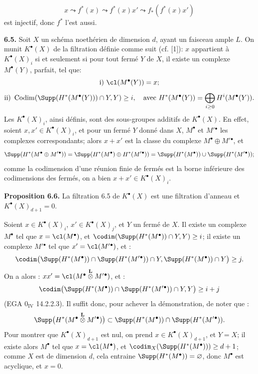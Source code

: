 \[
  x\leadsto f^*(x)\leadsto f^*(x)x'\leadsto f_*(f^*(x)x')
\]
est
injectif, donc $f^*$ l'est aussi.

\textbf{6.5.} Soit $X$ un schéma noethérien de dimension $d$, ayant un faisceau ample $L$. On munit $K^{\bullet}(X)$ de la filtration définie comme suit (cf. [1]): $x$ appartient à $K^{\bullet}(X)_i$ si et seulement si pour tout fermé $Y$ de $X$, il existe un complexe $M^\bullet(Y)$, parfait, tel que:
\[
  \text{i) } \cl(M^\bullet(Y))=x;
\]
\[
  \text{ii) } \operatorname{Codim}(\Supp(H^*(M^\bullet(Y)))\cap Y,Y)\ge i,
  \quad\text{avec } H^*(M^\bullet(Y))=\bigoplus_{i\ge0}H^i(M^\bullet(Y)).
\]
Les $K^{\bullet}(X)_i$, ainsi définis, sont des sous-groupes additifs de $K^{\bullet}(X)$. En effet, soient $x,x'\in K^{\bullet}(X)_i$, et pour un fermé $Y$ donné dans $X$, $M^\bullet$ et $M'{}^\bullet$ les complexes correspondants; alors $x+x'$ est la classe du complexe $M^\bullet\oplus M'{}^\bullet$, et
\[
\Supp(H^*(M^\bullet\oplus M'{}^\bullet))
 =\Supp(H^*(M^\bullet)\oplus H^*(M'{}^\bullet))
 =\Supp(H^*(M^\bullet))\cup\Supp(H^*(M'{}^\bullet));
\]
comme la codimension d'une réunion finie de fermés est la borne inférieure des codimensions des fermés, on a bien $x+x'\in K^{\bullet}(X)_i$.

\textbf{Proposition 6.6.} La filtration 6.5 de $K^{\bullet}(X)$ est une filtration d'anneau et $K^{\bullet}(X)_{d+1}=0$.

Soient $x\in K^{\bullet}(X)_i$, $x'\in K^{\bullet}(X)_j$, et $Y$ un fermé de $X$. Il existe un complexe $M^\bullet$ tel que $x=\cl(M^\bullet)$, et $\codim(\Supp(H^*(M^\bullet))\cap Y,Y)\ge i$; il existe un complexe $M'{}^\bullet$ tel que $x'=\cl(M'{}^\bullet)$, et :
\[
\codim\bigl(\Supp(H^*(M^\bullet))\cap\Supp(H^*(M'{}^\bullet))\cap Y,
            \Supp(H^*(M^\bullet))\cap Y\bigr)\ge j.
\]
On a alors : $xx'=\cl(M^\bullet\overset{\mathbf L}{\otimes}M'{}^\bullet)$, et :
\[
\codim\bigl(\Supp(H^*(M^\bullet))\cap\Supp(H^*(M'{}^\bullet))\cap Y,Y\bigr)\ge i+j
\]
(EGA $0_{\mathrm{IV}}$ 14.2.2.3). Il
suffit donc, pour achever la démonstration, de noter que :
\[
\Supp\bigl(H^*(M^\bullet\overset{\mathbf L}{\otimes}M'{}^\bullet)\bigr)
 \subset \Supp(H^*(M^\bullet))\cap\Supp(H^*(M'{}^\bullet)).
\]
Pour montrer que $K^{\bullet}(X)_{d+1}$ est nul, on prend $x\in K^{\bullet}(X)_{d+1}$, et $Y=X$; il existe alors $M^\bullet$ tel que $x=\cl(M^\bullet)$, et $\codim_X(\Supp(H^*(M^\bullet)))\ge d+1$; comme $X$ est de dimension $d$, cela entraine $\Supp(H^*(M^\bullet))=\varnothing$, donc $M^\bullet$ est acyclique, et $x=0$.

